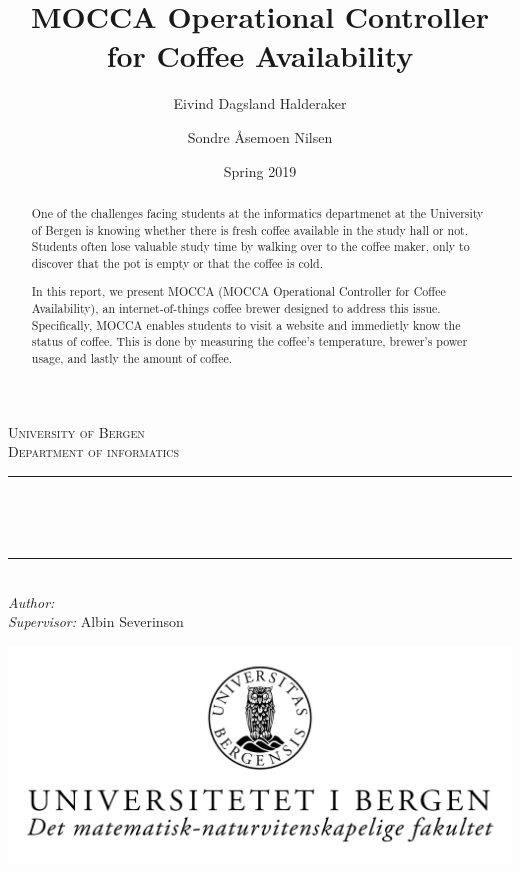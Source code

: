 \documentclass[12pt,a4paper,oneside,article]{memoir}
\title{MOCCA Operational Controller for Coffee Availability}
\author{Eivind Dagsland Halderaker \and Sondre Åsemoen Nilsen}
\date{Spring 2019}
\numberwithin{equation}{chapter}
\begin{document}
\begin{titlingpage}

\newcommand{\HRule}{\rule{\linewidth}{0.5mm}}
\centering

\textsc{\LARGE University of Bergen \\ Department of informatics}\\[1.5cm] %

\HRule\\[0.5cm]
\begin{Huge}
	\bfseries{\thetitle}\\[0.7cm]
\end{Huge}
\HRule\\[0.5cm]

{\large \emph{Author:} \theauthor}\\
{\large \emph{Supervisor:} Albin Severinson\\[2cm]}

\centerline{\includegraphics[scale=1.9]{figures/canvasWithFaculty}}
{\large \thedate}\\[3cm]
\vfill

\begin{abstract}
One of the challenges facing students at the informatics departmenet at the 
University of Bergen is knowing whether there is fresh coffee available in the 
study hall or not.  Students often lose valuable study time by walking over to 
the coffee maker, only to discover that the pot is empty or that the coffee is 
cold.

In this report, we present MOCCA (MOCCA Operational Controller for Coffee 
Availability), an internet-of-things coffee brewer designed to address this 
issue. Specifically, MOCCA enables students to visit a website and immedietly 
know the status of coffee. This is done by measuring the coffee's temperature, 
brewer's power usage, and lastly the amount of coffee.
\end{abstract}
\end{titlingpage}
\end{document}
